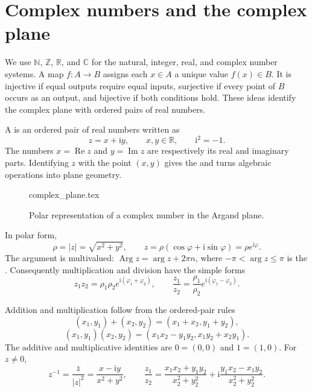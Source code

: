 \section{Complex numbers and the complex plane}

We use $\mathbb{N}$, $\mathbb{Z}$, $\mathbb{R}$, and $\mathbb{C}$ for the natural, integer, real, and complex number systems. A map $f:A\to B$ assigns each $x\in A$ a unique value $f(x)\in B$. It is injective if equal outputs require equal inputs, surjective if every point of $B$ occurs as an output, and bijective if both conditions hold. These ideas identify the complex plane with ordered pairs of real numbers.

A  is an ordered pair of real numbers written as
\begin{equation}
z=x+\mathrm{i}y,\qquad x,y\in\mathbb{R},\qquad \mathrm{i}^2=-1.
\end{equation}
The numbers $x=\operatorname{Re}z$ and $y=\operatorname{Im}z$ are respectively its real and imaginary parts. Identifying $z$ with the point $(x,y)$ gives the  and turns algebraic operations into plane geometry.

\begin{figure}[htb]
    \centering
    {complex_plane.tex}
    \caption{Polar representation of a complex number in the Argand plane.}
    \label{fig:ch06-complex-plane}
\end{figure}

In polar form,
\begin{equation}
\rho=|z|=\sqrt{x^2+y^2},\qquad
z=\rho(\cos\varphi+\mathrm{i}\sin\varphi)=\rho e^{\mathrm{i}\varphi}.
\end{equation}
The argument is multivalued: $\operatorname{Arg}z=\arg z+2\pi n$, where $-\pi<\arg z\leq\pi$ is the . Consequently multiplication and division have the simple forms
\begin{equation}
z_1z_2=\rho_1\rho_2e^{\mathrm{i}(\varphi_1+\varphi_2)},
\qquad
\frac{z_1}{z_2}=\frac{\rho_1}{\rho_2}e^{\mathrm{i}(\varphi_1-\varphi_2)}.
\end{equation}

Addition and multiplication follow from the ordered-pair rules
\begin{equation}
(x_1,y_1)+(x_2,y_2)=(x_1+x_2,y_1+y_2),
\end{equation}
\begin{equation}
(x_1,y_1)(x_2,y_2)=(x_1x_2-y_1y_2,x_1y_2+x_2y_1).
\end{equation}
The additive and multiplicative identities are $0=(0,0)$ and $1=(1,0)$. For $z\ne0$,
\begin{equation}
z^{-1}=\frac{\bar z}{|z|^2}=\frac{x-\mathrm{i}y}{x^2+y^2},
\qquad
\frac{z_1}{z_2}=\frac{x_1x_2+y_1y_2}{x_2^2+y_2^2}
+\mathrm{i}\frac{y_1x_2-x_1y_2}{x_2^2+y_2^2}.
\end{equation}

